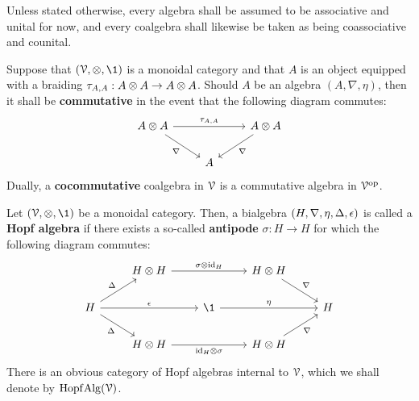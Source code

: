             \begin{convention}
                Unless stated otherwise, every algebra shall be assumed to be associative and unital for now, and every coalgebra shall likewise be taken as being coassociative and counital. 
            \end{convention}
            \begin{definition}[(Co)commutativity] \label{def: (co)commutativity}
                Suppose that $(\calV, \tensor, \1)$ is a monoidal category and that $A$ is an object equipped with a braiding $\tau_{A, A}: A \tensor A \to A \tensor A$. Should $A$ be an algebra $(A, \nabla, \eta)$, then it shall be \textbf{commutative} in the event that the following diagram commutes:
                    $$
                        \begin{tikzcd}
                        	{A \tensor A} && {A \tensor A} \\
                        	& A
                        	\arrow["{\tau_{A, A}}", from=1-1, to=1-3]
                        	\arrow["\nabla"', from=1-1, to=2-2]
                        	\arrow["\nabla", from=1-3, to=2-2]
                        \end{tikzcd}
                    $$
                Dually, a \textbf{cocommutative} coalgebra in $\mathcal{V}$ is a commutative algebra in $\mathcal{V}^{\mathrm{op}}$.
            \end{definition}
            \begin{definition} \label{def: hopf_algebras}
                Let $(\calV, \tensor, \1)$ be a monoidal category. Then, a bialgebra $(H, \nabla, \eta, \Delta, \epsilon)$ is called a \textbf{Hopf algebra} if there exists a so-called \textbf{antipode} $\sigma: H \to H$ for which the following diagram commutes:
                    $$
                        \begin{tikzcd}
                        	& {H \tensor H} && {H \tensor H} \\
                        	{H} && {\1} && {H} \\
                        	& {H \tensor H} && {H \tensor H}
                        	\arrow["{\Delta}"', from=2-1, to=3-2]
                        	\arrow["{\id_H \tensor \sigma}"', from=3-2, to=3-4]
                        	\arrow["{\Delta}", from=2-1, to=1-2]
                        	\arrow["{\sigma \tensor \id_H}", from=1-2, to=1-4]
                        	\arrow["{\nabla}", from=1-4, to=2-5]
                        	\arrow["{\nabla}"', from=3-4, to=2-5]
                        	\arrow["{\e}", from=2-1, to=2-3]
                        	\arrow["{\eta}", from=2-3, to=2-5]
                        \end{tikzcd}
                    $$
                There is an obvious category of Hopf algebras internal to $\mathcal{V}$, which we shall denote by $\mathrm{Hopf}\mathrm{Alg}(\mathcal{V})$.
            \end{definition}
